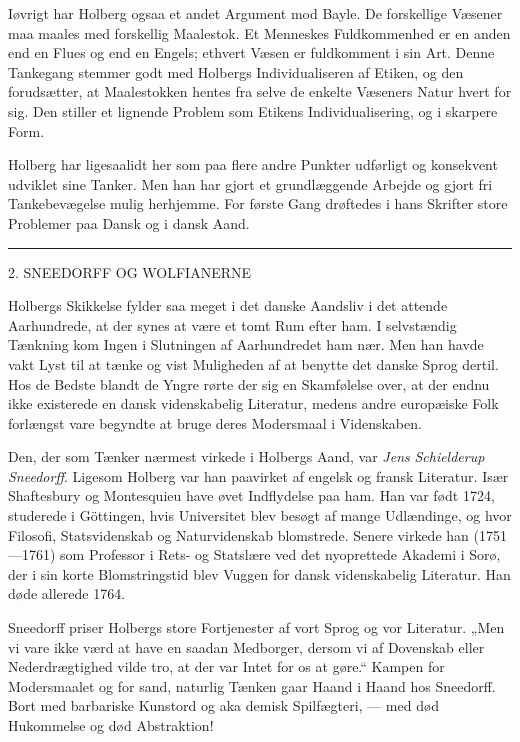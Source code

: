 \documentclass[12pt,a4paper,openany]{book}
\newcommand{\opage}[1]{\marginnote{\footnotesize\textit{[#1]}}}
\begin{document}
Iøvrigt har Holberg ogsaa et andet Argument mod Bayle. De forskellige Væsener
maa maales med forskellig Maalestok. Et Menneskes Fuldkommenhed er en anden end
en Flues og end en Engels; ethvert Væsen er fuldkomment i sin Art. Denne
Tankegang stemmer godt med Holbergs Individualiseren af Etiken, og den
forudsætter, at Maalestokken hentes fra selve de enkelte Væseners Natur hvert
for sig. Den stiller et lignende Problem som Etikens Individualisering, og i
skarpere Form.

Holberg har ligesaalidt her som paa flere andre Punkter udførligt og konsekvent
udviklet sine Tanker. Men han har gjort et grundlæggende Arbejde og gjort fri
Tankebevægelse mulig herhjemme. For første Gang drøftedes i hans Skrifter store
Problemer paa Dansk og i dansk Aand.

\begin{center}\rule{2cm}{0.4pt}\end{center}

\setcounter{footnote}{0}%
\opage{16}

\begin{center}\large 2. SNEEDORFF OG WOLFIANERNE\end{center}

Holbergs Skikkelse fylder saa meget i det danske Aandsliv i det attende
Aarhundrede, at der synes at være et tomt Rum efter ham. I selvstændig Tænkning
kom Ingen i Slutningen af Aarhundredet ham nær. Men han havde vakt Lyst til at
tænke og vist Muligheden af at benytte det danske Sprog dertil. Hos de Bedste
blandt de Yngre rørte der sig en Skamfølelse over, at der endnu ikke existerede
en dansk videnskabelig Literatur, medens andre europæiske Folk forlængst vare
begyndte at bruge deres Modersmaal i Videnskaben.

Den, der som Tænker nærmest virkede i Holbergs Aand, var \emph{Jens}
\emph{Schielderup} \emph{Sneedorff}. Ligesom Holberg var han paavirket af
engelsk og fransk Literatur. Især Shaftesbury og Montesquieu have øvet
Indflydelse paa ham. Han var født 1724, studerede i Göttingen, hvis Universitet
blev besøgt af mange Udlændinge, og hvor Filosofi, Statsvidenskab og
Naturvidenskab blomstrede. Senere virkede han (1751---1761) som Professor i
Rets- og Statslære ved det nyoprettede Akademi i Sorø, der i sin korte
Blomstringstid blev Vuggen for dansk videnskabelig Literatur. Han døde allerede 1764.

Sneedorff priser Holbergs store Fortjenester af vort Sprog og vor Literatur.
„Men vi vare ikke værd at have en saadan Medborger, dersom vi af Dovenskab
eller Nederdrægtighed vilde tro, at der var Intet for os at gøre.“ Kampen for
Modersmaalet og for sand, naturlig Tænken gaar Haand i Haand hos Sneedorff.
Bort med barbariske Kunstord og aka%
\setcounter{footnote}{0}%
\opage{17}demisk Spilfægteri, --- med død Hukommelse og død Abstraktion!
\end{document}
